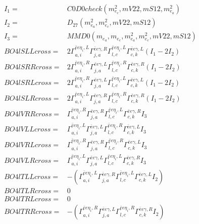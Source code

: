 \documentclass[A4,landscape]{article}
\begin{document}
\begin{align} 
I_1 = & C0D0check(m^2_{e_{{c}}}, mV22, mS12, m^2_{e_{{a}}}) \\ 
I_2 = & D_{27}(m^2_{e_{{a}}}, m^2_{e_{{c}}}, mV22, mS12) \\ 
I_3 = & MMD0(m_{e_{{a}}}, m_{e_{{c}}}, m^2_{e_{{a}}}, m^2_{e_{{c}}}, mV22, mS12) \\ 
  BO4lSLLcross= & 2  \Gamma^{\bar{e}e \eta_i ,L}_{a, i} \Gamma^{\bar{e}e \gamma ,R}_{j, a} \Gamma^{\bar{e}e \eta_i ,L}_{l, c} \Gamma^{\bar{e}e \gamma ,L}_{c, k} (I_1 - 2 I_2) \\ 
  BO4lSRRcross= & 2  \Gamma^{\bar{e}e \eta_i ,R}_{a, i} \Gamma^{\bar{e}e \gamma ,L}_{j, a} \Gamma^{\bar{e}e \eta_i ,R}_{l, c} \Gamma^{\bar{e}e \gamma ,R}_{c, k} (I_1 - 2 I_2) \\ 
  BO4lSRLcross= & 2  \Gamma^{\bar{e}e \eta_i ,R}_{a, i} \Gamma^{\bar{e}e \gamma ,L}_{j, a} \Gamma^{\bar{e}e \eta_i ,L}_{l, c} \Gamma^{\bar{e}e \gamma ,L}_{c, k} (I_1 - 2 I_2) \\ 
  BO4lSLRcross= & 2  \Gamma^{\bar{e}e \eta_i ,L}_{a, i} \Gamma^{\bar{e}e \gamma ,R}_{j, a} \Gamma^{\bar{e}e \eta_i ,R}_{l, c} \Gamma^{\bar{e}e \gamma ,R}_{c, k} (I_1 - 2 I_2) \\ 
  BO4lVRRcross= &  \Gamma^{\bar{e}e \eta_i ,R}_{a, i} \Gamma^{\bar{e}e \gamma ,R}_{j, a} \Gamma^{\bar{e}e \eta_i ,L}_{l, c} \Gamma^{\bar{e}e \gamma ,R}_{c, k} I_3 \\ 
  BO4lVLLcross= &  \Gamma^{\bar{e}e \eta_i ,L}_{a, i} \Gamma^{\bar{e}e \gamma ,L}_{j, a} \Gamma^{\bar{e}e \eta_i ,R}_{l, c} \Gamma^{\bar{e}e \gamma ,L}_{c, k} I_3 \\ 
  BO4lVRLcross= &  \Gamma^{\bar{e}e \eta_i ,R}_{a, i} \Gamma^{\bar{e}e \gamma ,R}_{j, a} \Gamma^{\bar{e}e \eta_i ,R}_{l, c} \Gamma^{\bar{e}e \gamma ,L}_{c, k} I_3 \\ 
  BO4lVLRcross= &  \Gamma^{\bar{e}e \eta_i ,L}_{a, i} \Gamma^{\bar{e}e \gamma ,L}_{j, a} \Gamma^{\bar{e}e \eta_i ,L}_{l, c} \Gamma^{\bar{e}e \gamma ,R}_{c, k} I_3 \\ 
  BO4lTLLcross= & -( \Gamma^{\bar{e}e \eta_i ,L}_{a, i} \Gamma^{\bar{e}e \gamma ,R}_{j, a} \Gamma^{\bar{e}e \eta_i ,L}_{l, c} \Gamma^{\bar{e}e \gamma ,L}_{c, k} I_2) \\ 
  BO4lTLRcross= & 0 \\ 
  BO4lTRLcross= & 0 \\ 
  BO4lTRRcross= & -( \Gamma^{\bar{e}e \eta_i ,R}_{a, i} \Gamma^{\bar{e}e \gamma ,L}_{j, a} \Gamma^{\bar{e}e \eta_i ,R}_{l, c} \Gamma^{\bar{e}e \gamma ,R}_{c, k} I_2) \\ 
\end{align} 
\end{document}
